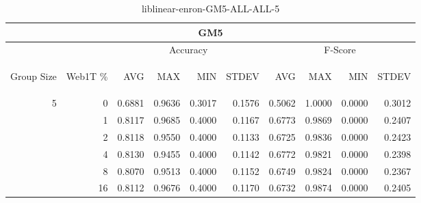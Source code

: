 \begin{center}
\begin{table}[htbp]
\begin{tabular}{ | r | r | r | r | r | r | r | r | r | r |}
\hline
\multicolumn{10}{|c|}{GM5}\\
\hline
 & & \multicolumn{4}{|c|}{Accuracy} & \multicolumn{4}{|c|}{F-Score}\\ \cline{3-10}
\begin{sideways}Group Size\end{sideways} & \begin{sideways}Web1T \%\end{sideways} & \begin{sideways}AVG\end{sideways} & \begin{sideways}MAX\end{sideways} & \begin{sideways}MIN\end{sideways} & \begin{sideways}STDEV\end{sideways} & \begin{sideways}AVG\end{sideways} & \begin{sideways}MAX\end{sideways} & \begin{sideways}MIN\end{sideways} & \begin{sideways}STDEV\end{sideways}\\
\hline
\multirow{6}{*}{5}
 & 0 & 0.6881 & 0.9636 & 0.3017 & 0.1576 & 0.5062 & 1.0000 & 0.0000 & 0.3012\\ \cline{2-10}
 & 1 & 0.8117 & 0.9685 & 0.4000 & 0.1167 & 0.6773 & 0.9869 & 0.0000 & 0.2407\\ \cline{2-10}
 & 2 & 0.8118 & 0.9550 & 0.4000 & 0.1133 & 0.6725 & 0.9836 & 0.0000 & 0.2423\\ \cline{2-10}
 & 4 & 0.8130 & 0.9455 & 0.4000 & 0.1142 & 0.6772 & 0.9821 & 0.0000 & 0.2398\\ \cline{2-10}
 & 8 & 0.8070 & 0.9513 & 0.4000 & 0.1152 & 0.6749 & 0.9824 & 0.0000 & 0.2367\\ \cline{2-10}
 & 16 & 0.8112 & 0.9676 & 0.4000 & 0.1170 & 0.6732 & 0.9874 & 0.0000 & 0.2405\\ \cline{2-10}
\hline
\end{tabular}
\caption{liblinear-enron-GM5-ALL-ALL-5}
\end{table}
\end{center}

